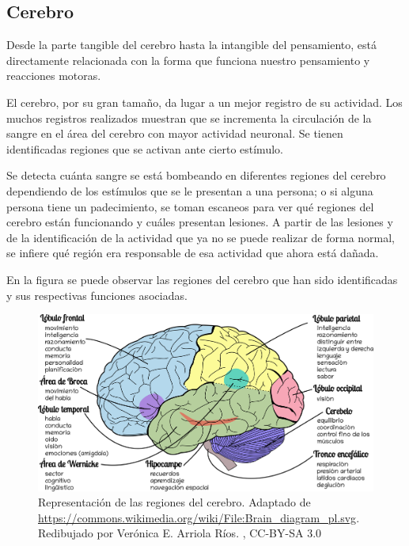 \subsection{Cerebro}

Desde la parte tangible del cerebro hasta la intangible del pensamiento, está directamente relacionada con la forma que funciona nuestro pensamiento y reacciones motoras.


El cerebro, por su gran tamaño, da lugar a un mejor registro de su actividad. Los muchos registros realizados muestran que se incrementa la circulación de la sangre en el área del cerebro con mayor actividad neuronal. Se tienen identificadas regiones que se activan ante cierto estímulo. \parencite{neurona_A_cerebro}


 Se detecta cuánta sangre se está bombeando en diferentes regiones del cerebro dependiendo de los estímulos que se le presentan a una persona; o si alguna persona tiene un padecimiento, se toman escaneos para ver qué regiones del cerebro están funcionando y cuáles presentan lesiones. A partir de las lesiones y de la identificación de la actividad que ya no se puede realizar de forma normal, se infiere qué región era responsable de esa actividad que ahora está dañada.\parencite{estudiosF}

 En la figura  se puede observar las regiones del cerebro que han sido identificadas y sus respectivas funciones asociadas.
 
 \begin{figure}[h]
  \centering
  \includegraphics[scale=0.4]{../Figuras/cerebro.png}
  \caption{Representación de las regiones del cerebro. Adaptado de \url{https://commons.wikimedia.org/wiki/File:Brain_diagram_pl.svg}. Redibujado por Verónica E. Arriola Ríos. , CC-BY-SA 3.0}
  \label{fig:cerebroFunciones}
 \end{figure}

